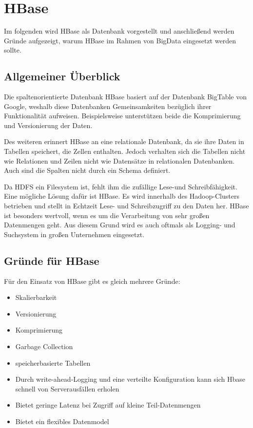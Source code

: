 \section{HBase}
Im folgenden wird HBase als Datenbank vorgestellt und anschließend werden Gründe aufgezeigt, warum HBase im Rahmen von BigData eingesetzt werden sollte.

\subsection{Allgemeiner Überblick}
Die spaltenorientierte Datenbank HBase basiert auf der Datenbank BigTable von Google, weshalb diese Datenbanken Gemeinsamkeiten bezüglich ihrer Funktionalität aufweisen. Beispielsweise unterstützen beide die Komprimierung und Versionierung der Daten.

Des weiteren erinnert HBase an eine relationale Datenbank, da sie ihre Daten in Tabellen speichert, die Zellen enthalten. Jedoch verhalten sich die Tabellen nicht wie Relationen und Zeilen nicht wie Datensätze in relationalen Datenbanken. Auch sind die Spalten nicht durch ein Schema definiert.

Da HDFS ein Filesystem ist, fehlt ihm die zufällige Lese-und Schreibfähigkeit. Eine mögliche Lösung dafür ist HBase. Es wird innerhalb des Hadoop-Clusters betrieben und stellt in Echtzeit Lese- und Schreibzugriff zu den Daten her. HBase ist besonders wertvoll, wenn es um die Verarbeitung von sehr großen Datenmengen geht. Aus diesem Grund wird es auch oftmals als Logging- und Suchsystem in großen Unternehmen eingesetzt.

\subsection{Gründe für HBase}
Für den Einsatz von HBase gibt es gleich mehrere Gründe:
\begin{itemize}

\item Skalierbarkeit
\item Versionierung
\item Komprimierung
\item Garbage Collection
\item speicherbasierte Tabellen
\item Durch write-ahead-Logging und eine verteilte Konfiguration kann sich Hbase schnell von Serverausfällen erholen
\item Bietet geringe Latenz bei Zugriff auf kleine Teil-Datenmengen 
\item Bietet ein flexibles Datenmodel
\end{itemize}